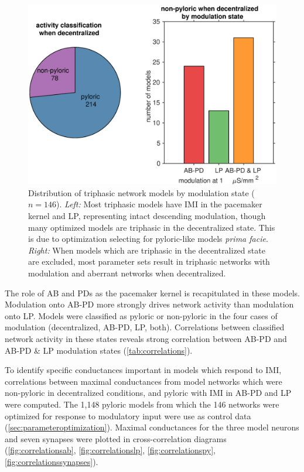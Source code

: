 \begin{figure}
	\centering
	\includegraphics[width=1.0\linewidth]{gfx/all-modulation/all_stats}
	\caption[Distribution of rhythmicity in network models]{Distribution of triphasic network models by modulation state ($n=146$). \textit{Left:} Most triphasic models have \acs{IMI} in the pacemaker kernel and \acs{LP}, representing intact descending modulation, though many optimized models are triphasic in the decentralized state. This is due to optimization selecting for pyloric-like models \textit{prima facie}. \textit{Right:} When models which are triphasic in the decentralized state are excluded, most parameter sets result in triphasic networks with modulation and aberrant networks when decentralized.}
	\label{fig:allstats}
\end{figure}

The role of \acs{AB} and \acsp{PD} as the pacemaker kernel is recapitulated in these models. Modulation onto \acs{AB}-\acs{PD} more strongly drives network activity than modulation onto \acs{LP}. Models were classified as pyloric or non-pyloric in the four cases of modulation (decentralized, \acs{AB}-\acs{PD}, \acs{LP}, both). Correlations between classified network activity in these states reveals strong correlation between \acs{AB}-\acs{PD} and \acs{AB}-\acs{PD} \& \acs{LP} modulation states (\autoref{tab:correlations}).

To identify specific conductances important in models which respond to \acs{IMI}, correlations between maximal conductances from model networks which were non-pyloric in decentralized conditions, and pyloric with \acs{IMI} in \acs{AB}-\acs{PD} and \acs{LP} were computed. The 1,148 pyloric models from which the 146 networks were optimized for response to modulatory input were use as control data (\autoref{sec:parameteroptimization}). Maximal conductances for the three model neurons and seven synapses were plotted in cross-correlation diagrams (\autoref{fig:correlationsab}, \autoref{fig:correlationslp}, \autoref{fig:correlationspy}, \autoref{fig:correlationssynapses}). 

